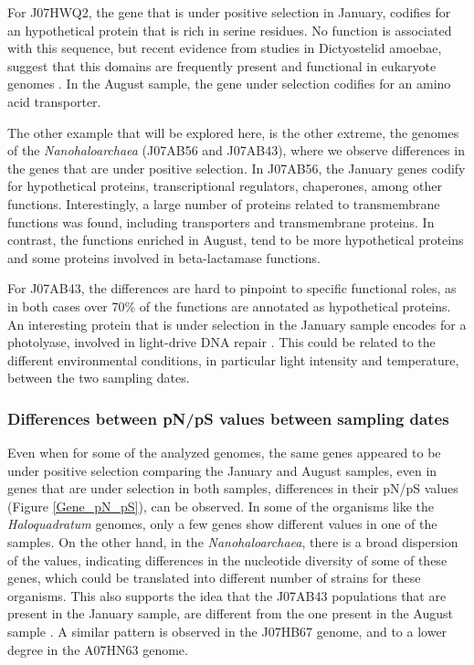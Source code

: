For J07HWQ2, the gene that is under positive selection in January, codifies for an hypothetical protein that is rich in serine residues. No function is associated with this sequence, but recent evidence from studies in Dictyostelid amoebae, suggest that this domains are frequently present and functional in eukaryote genomes \cite{Tian:2013jv}. In the August sample, the gene under selection codifies for an amino acid transporter.

The other example that will be explored here, is the other extreme, the genomes of the \textit{Nanohaloarchaea} (J07AB56 and J07AB43), where we observe differences in the genes that are under positive selection. In J07AB56, the January genes codify for hypothetical proteins, transcriptional regulators, chaperones, among other functions. Interestingly, a large number of proteins related to transmembrane functions was found, including transporters and transmembrane proteins. In contrast, the functions enriched in August, tend to be more hypothetical proteins and some proteins involved in beta-lactamase functions. 

For J07AB43, the differences are hard to pinpoint to specific functional roles, as in both cases over 70\% of the functions are annotated as hypothetical proteins. An interesting protein that is under selection in the January sample encodes for a photolyase, involved in light-drive DNA repair \cite{Weber:2005fk}. This could be related to the different environmental conditions, in particular light intensity and temperature, between the two sampling dates.

\subsubsection{Differences between pN/pS values between sampling dates}

Even when for some of the analyzed genomes, the same genes appeared to be under positive selection comparing the January and August samples, even in genes that are under selection in both samples, differences in their pN/pS values (Figure \ref{Gene_pN_pS}), can be observed. In some of the organisms like the \textit{Haloquadratum} genomes, only a few genes show different values in one of the samples. On the other hand, in the \textit{Nanohaloarchaea}, there is a broad dispersion of the values, indicating differences in the nucleotide diversity of some of these genes, which could be translated into different number of strains for these organisms. This also supports the idea that the J07AB43 populations that are present in the January sample, are different from the one present in the August sample \cite{Vos:2011ux}. A similar  pattern is observed in the J07HB67 genome, and to a lower degree in the A07HN63 genome.


